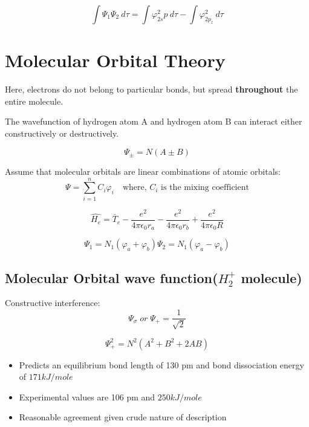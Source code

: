 \documentclass[12pt]{article}
\theoremstyle{definition}
\begin{document}
\begin{equation*}
	\int{{\Psi_1 \Psi_2}}\: d{\tau} = \int {\varphi_{2s}^2p} \: d{\tau} - \int{\varphi_{2p_z}^2} \: d{\tau}
\end{equation*}

\section{Molecular Orbital Theory}
Here, electrons do not belong to particular bonds, but spread \textbf{throughout} the entire molecule.

The wavefunction of hydrogen atom A and hydrogen atom B can interact either constructively or destructively.

\begin{equation*}
	\Psi_{\pm} = N(A \pm B)
\end{equation*}

Assume that molecular orbitals are linear combinations of atomic orbitals:
\begin{equation*}
	\Psi = \sum^{n}_{i=1} C_i\varphi_i \quad \textrm{where, $C_i$ is the mixing coefficient}
\end{equation*}

\begin{equation*}
	\hat{H_e} = \check{T_e} - \frac{e^2 }{4 \pi \epsilon_0 r_a} - \frac{e^2}{4 \pi \epsilon_0 r_b} + \frac{e^2}{4 \pi \epsilon_0 R} 
\end{equation*}

\begin{equation*}
	\Psi_1 = N_1(\varphi_a + \varphi_b)
	\Psi_2 = N_1(\varphi_a - \varphi_b)
\end{equation*}

\subsection{Molecular Orbital wave function($H_2^+$ molecule)}

Constructive interference:
\begin{equation*}
	\Psi_\sigma\;or\; \Psi_+ = \frac{1}{\sqrt{2}} 
\end{equation*}

\begin{equation*}
	\Psi_+^2 = N^2 \left( A^2 + B^2 + 2AB \right)
\end{equation*}

\begin{itemize}
	\item Predicts an equilibrium bond length of 130 pm and bond dissociation energy of $171 kJ/mole$
	\item Experimental values are 106 pm and $250 kJ/mole$
	\item Reasonable agreement given crude nature of description
\end{itemize}
\end{document}
